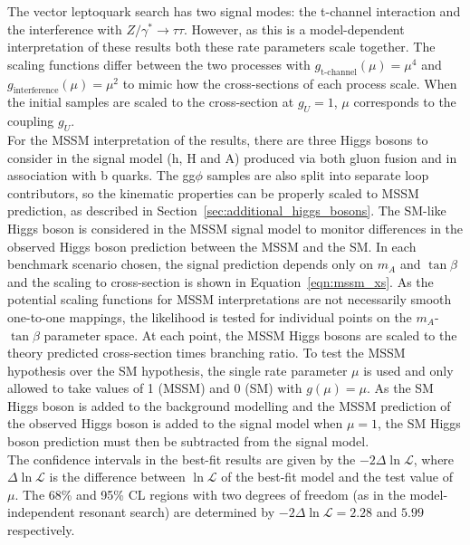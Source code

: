 The vector leptoquark search has two signal modes: the t-channel interaction and the interference with $Z/\gamma^* \rightarrow \tau\tau$. 
However, as this is a model-dependent interpretation of these results both these rate parameters scale together.
The scaling functions differ between the two processes with $g_{\text{t-channel}}(\mu) = \mu^4$ and $g_{\text{interference}}(\mu) = \mu^2$ to mimic how the cross-sections of each process scale.
When the initial samples are scaled to the cross-section at $g_{U}=1$, $\mu$ corresponds to the coupling $g_{U}$. \\

For the \ac{MSSM} interpretation of the results, there are three Higgs bosons to consider in the signal model (h, H and A) produced via both gluon fusion and in association with b quarks.
The gg$\phi$ samples are also split into separate loop contributors, so the kinematic properties can be properly scaled to \ac{MSSM} prediction, as described in Section~\ref{sec:additional_higgs_bosons}.
The \ac{SM}-like Higgs boson is considered in the \ac{MSSM} signal model to monitor differences in the observed Higgs boson prediction between the \ac{MSSM} and the \ac{SM}.
In each benchmark scenario chosen, the signal prediction depends only on $m_{A}$ and $\tan\beta$ and the scaling to cross-section is shown in Equation~\ref{eqn:mssm_xs}.
As the potential scaling functions for \ac{MSSM} interpretations are not necessarily smooth one-to-one mappings, the likelihood is tested for individual points on the $m_{A}$-$\tan\beta$ parameter space.
At each point, the \ac{MSSM} Higgs bosons are scaled to the theory predicted cross-section times branching ratio.
To test the \ac{MSSM} hypothesis over the \ac{SM} hypothesis, the single rate parameter $\mu$ is used and only allowed to take values of 1 (\ac{MSSM}) and 0 (\ac{SM}) with $g(\mu)=\mu$.
As the SM Higgs boson is added to the background modelling and the \ac{MSSM} prediction of the observed Higgs boson is added to the signal model when $\mu=1$, the \ac{SM} Higgs boson prediction must then be subtracted from the signal model. \\

The confidence intervals in the best-fit results are given by the $-2\Delta\ln\mathcal{L}$, where $\Delta\ln\mathcal{L}$ is the difference between $\ln\mathcal{L}$ of the best-fit model and the test value of $\mu$. 
The 68\% and 95\% \ac{CL} regions with two degrees of freedom (as in the model-independent resonant search) are determined by $-2\Delta\ln\mathcal{L} = 2.28$ and $5.99$ respectively. \\

